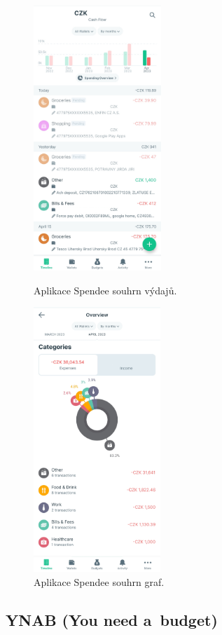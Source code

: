 \begin{figure}[H]
  \centering
  \begin{minipage}[b]{0.4\textwidth}
    \includegraphics[height=10cm]{spendeecropped.pdf}
    \caption{Aplikace Spendee souhrn výdajů.}
    \label{fig:speende1}
  \end{minipage}
  \hfill
  \begin{minipage}[b]{0.4\textwidth}
    \includegraphics[height=10cm]{obrazky-figures/spendee1.pdf}
    \caption{Aplikace Spendee souhrn graf.}
    \label{fig:speende2}
    
  \end{minipage}
\end{figure}
\subsection*{YNAB (You need a~budget)}

